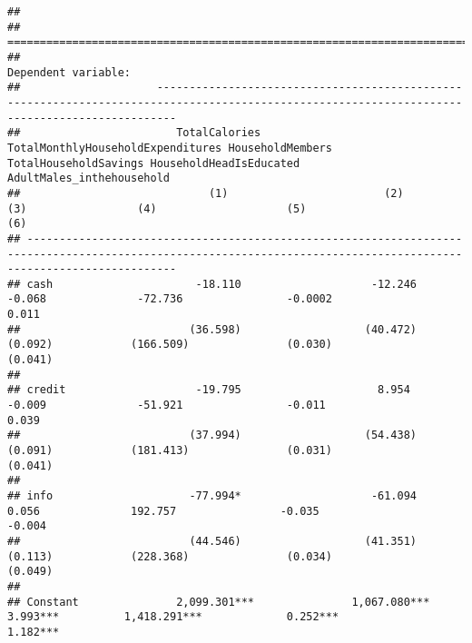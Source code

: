 \documentclass[
]{article}
\begin{document}
\begin{verbatim}
## 
## ===================================================================================================================================================================
##                                                                                   Dependent variable:                                                              
##                     -----------------------------------------------------------------------------------------------------------------------------------------------
##                        TotalCalories    TotalMonthlyHouseholdExpenditures HouseholdMembers  TotalHouseholdSavings HouseholdHeadIsEducated AdultMales_inthehousehold
##                             (1)                        (2)                       (3)                 (4)                    (5)                      (6)           
## -------------------------------------------------------------------------------------------------------------------------------------------------------------------
## cash                      -18.110                    -12.246                   -0.068              -72.736                -0.0002                   0.011          
##                          (36.598)                   (40.472)                   (0.092)            (166.509)               (0.030)                  (0.041)         
##                                                                                                                                                                    
## credit                    -19.795                     8.954                    -0.009              -51.921                -0.011                    0.039          
##                          (37.994)                   (54.438)                   (0.091)            (181.413)               (0.031)                  (0.041)         
##                                                                                                                                                                    
## info                     -77.994*                    -61.094                    0.056              192.757                -0.035                   -0.004          
##                          (44.546)                   (41.351)                   (0.113)            (228.368)               (0.034)                  (0.049)         
##                                                                                                                                                                    
## Constant               2,099.301***               1,067.080***                3.993***          1,418.291***             0.252***                 1.182***         

\end{verbatim}
\end{document}
